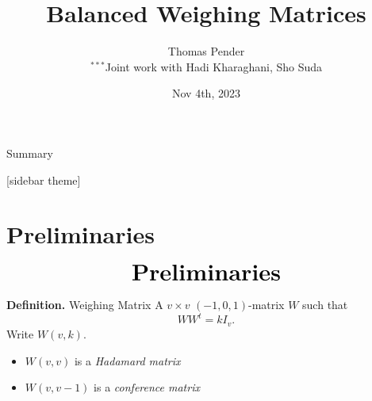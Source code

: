 \documentclass{beamer}
\title[Balanced Weighing Matrices]{Balanced Weighing Matrices}
\author[T. Pender]{Thomas Pender\\\scriptsize $^{***}$Joint work with Hadi Kharaghani, Sho Suda}
\institute[SFU]{Department of Mathematics\\Simon Fraser University}
\date[10/10/2023]{Nov 4th, 2023}
\begin{document}
{
\begin{frame}
  \titlepage
\end{frame}
}

\begin{frame}{Summary}
  \tableofcontents[hideallsubsections,sections={1-5}]
\end{frame}
[sidebar theme]


\section{Preliminaries}

\begin{frame}
  \[
    \text{\huge\bf Preliminaries}
  \]
\end{frame}




\begin{frame}

  \begin{block}{{\bf Definition.} Weighing Matrix}
    A $v \times v$ $(-1,0,1)$-matrix $W$ such that
    \[
      WW^t = kI_v.
    \]
    Write $W(v,k)$.
  \end{block}

  \begin{itemize}
  \item $W(v,v)$ is a {\it Hadamard matrix}
  \item $W(v,v-1)$ is a {\it conference matrix}
  \end{itemize}

\end{frame}
\end{document}
